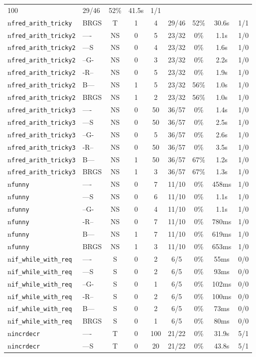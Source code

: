 \begin{tabular}{llccccccc}
100 & 29/46 & 52\% & 41.5s & 1/1 \\n\texttt{fred\_arith\_tricky} & BRGS & T & 1 & 4 & 29/46 & 52\% & 30.6s & 1/1 \\n\texttt{fred\_arith\_tricky2} & ---- & NS & 0 & 5 & 23/32 & 0\% & 1.1s & 1/0 \\n\texttt{fred\_arith\_tricky2} & ---S & NS & 0 & 4 & 23/32 & 0\% & 1.6s & 1/0 \\n\texttt{fred\_arith\_tricky2} & --G- & NS & 0 & 3 & 23/32 & 0\% & 2.2s & 1/0 \\n\texttt{fred\_arith\_tricky2} & -R-- & NS & 0 & 5 & 23/32 & 0\% & 1.9s & 1/0 \\n\texttt{fred\_arith\_tricky2} & B--- & NS & 1 & 5 & 23/32 & 56\% & 1.0s & 1/0 \\n\texttt{fred\_arith\_tricky2} & BRGS & NS & 1 & 2 & 23/32 & 56\% & 1.0s & 1/0 \\n\texttt{fred\_arith\_tricky3} & ---- & NS & 0 & 50 & 36/57 & 0\% & 1.4s & 1/0 \\n\texttt{fred\_arith\_tricky3} & ---S & NS & 0 & 50 & 36/57 & 0\% & 2.5s & 1/0 \\n\texttt{fred\_arith\_tricky3} & --G- & NS & 0 & 5 & 36/57 & 0\% & 2.6s & 1/0 \\n\texttt{fred\_arith\_tricky3} & -R-- & NS & 0 & 50 & 36/57 & 0\% & 3.5s & 1/0 \\n\texttt{fred\_arith\_tricky3} & B--- & NS & 1 & 50 & 36/57 & 67\% & 1.2s & 1/0 \\n\texttt{fred\_arith\_tricky3} & BRGS & NS & 1 & 3 & 36/57 & 67\% & 1.3s & 1/0 \\n\texttt{funny} & ---- & NS & 0 & 7 & 11/10 & 0\% & 458ms & 1/0 \\n\texttt{funny} & ---S & NS & 0 & 6 & 11/10 & 0\% & 1.1s & 1/0 \\n\texttt{funny} & --G- & NS & 0 & 4 & 11/10 & 0\% & 1.1s & 1/0 \\n\texttt{funny} & -R-- & NS & 0 & 7 & 11/10 & 0\% & 780ms & 1/0 \\n\texttt{funny} & B--- & NS & 1 & 7 & 11/10 & 0\% & 619ms & 1/0 \\n\texttt{funny} & BRGS & NS & 1 & 3 & 11/10 & 0\% & 653ms & 1/0 \\n\texttt{if\_while\_with\_req} & ---- & S & 0 & 2 & 6/5 & 0\% & 55ms & 0/0 \\n\texttt{if\_while\_with\_req} & ---S & S & 0 & 2 & 6/5 & 0\% & 93ms & 0/0 \\n\texttt{if\_while\_with\_req} & --G- & S & 0 & 1 & 6/5 & 0\% & 102ms & 0/0 \\n\texttt{if\_while\_with\_req} & -R-- & S & 0 & 2 & 6/5 & 0\% & 100ms & 0/0 \\n\texttt{if\_while\_with\_req} & B--- & S & 0 & 2 & 6/5 & 0\% & 73ms & 0/0 \\n\texttt{if\_while\_with\_req} & BRGS & S & 0 & 1 & 6/5 & 0\% & 80ms & 0/0 \\n\texttt{incrdecr} & ---- & T & 0 & 100 & 21/22 & 0\% & 31.9s & 5/1 \\n\texttt{incrdecr} & ---S & T & 0 & 20 & 21/22 & 0\% & 43.8s & 5/1 
\end{tabular}
